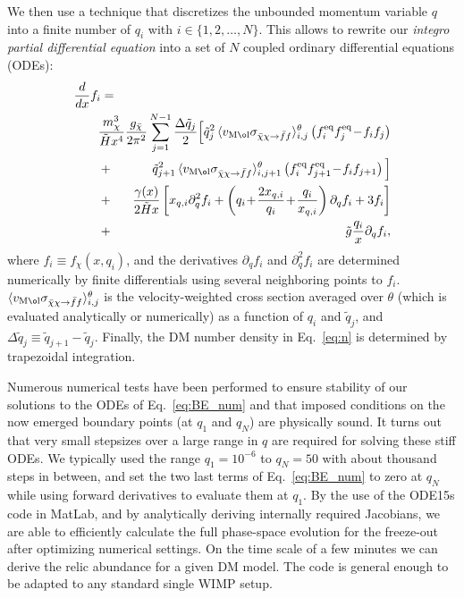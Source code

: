 \documentclass[twocolumn,showpacs,amsmath,amssymb,superscriptaddress,nofootinbib]{revtex4-1}
\def\nn{\nonumber}
\newcommand{\bea}{\begin{eqnarray}}
\newcommand{\eea}{\end{eqnarray}}
\newcommand{\p}{\partial}
\begin{document}
We then use a technique that  discretizes  the unbounded momentum variable $q$ into a finite number of 
$q_i$ with $i\in \{1,2,\ldots,N\}$. This allows to rewrite our  \emph{integro partial differential equation}  into 
a set of $N$ coupled ordinary differential equations (ODEs):
\bea
\frac{d}{dx} f_i &=& \nn\\
&& \hspace{-0.8cm} \frac{m_\chi^3}{\tilde{H} x^4}\frac{g_{\bar \chi} }{2\pi^2}
\sum_{j=1}^{N-1} 
\frac{\Delta \tilde q_j}{2} 
\Big[
   {\tilde q_j^2 } \,\langle v_{\rm M\o l} \sigma_{\bar\chi\chi\rightarrow \bar f f} \rangle_{i, j}^{\theta}
   \left( f^{\rm eq}_i f^{\rm eq}_j \!-\! f_if_j \right) \nn\\
&+&     {\tilde q_{j+1}^2 } \,\langle v_{\rm M\o l} \sigma_{\bar\chi\chi\rightarrow \bar f f} \rangle_{i, {j+1}}^{\theta}
 \left( f^{\rm eq}_i f^{\rm eq}_{j+1} \!-\! f_if_{j+1} \right)
\Big]
  \nn\\
&+&  \frac{\gamma(x)}{2 \tilde{H} x} \left[x_{q,i} \partial^2_q f_i+ \left(q_i\!+\!\frac{2 x_{q,i}}{q_i} \!+\! \frac{q_i}{x_{q,i}}  \right)\partial_q f_i+3 f_i\right] \nn\\
&+&    \tilde{g}   \frac{q_i}{x}  \partial_q f_i,
\label{eq:BE_num}
\eea
where $f_i \equiv f_\chi(x,q_i)$, and the derivatives $\p_q f_i$ and $\p^2_q f_i$ are determined numerically 
by finite differentials using several neighboring points to $f_i$.
$\langle v_{\rm M\o l} \sigma_{\bar\chi\chi\rightarrow \bar f f} \rangle_{i, j}^{\theta}$ is the
velocity-weighted cross section averaged over $\theta$ (which is evaluated analytically or numerically) 
as a function of $q_i$ and $\tilde{q}_j$, and $\Delta \tilde q_j \equiv  \tilde{q}_{j+1}- \tilde{q}_j$.  Finally, 
the DM number density in Eq.~\eqref{eq:n} is determined by trapezoidal integration.

Numerous numerical tests have been performed to ensure stability of our solutions to the ODEs of 
Eq.~\eqref{eq:BE_num} and that 
imposed conditions on the now emerged boundary points  (at $q_1$ and $q_N$) are physically sound.  
It turns out that very small stepsizes over a large range in $q$ are required for solving these stiff ODEs. 
We typically used the 
range $q_1 =10^{-6}$ to $q_N=50$ with about thousand steps in between, and set the two last terms of 
Eq.~\eqref{eq:BE_num} to zero at $q_N$ while using forward derivatives to evaluate them at $q_1$. 
By the use of  the ODE15s code in {\sf MatLab},
 and by analytically deriving internally required  Jacobians, we are 
able to efficiently calculate 
the full phase-space evolution for the freeze-out after optimizing numerical settings. On the time scale of a few minutes 
we can derive the relic abundance for a given DM model.
 The code is general enough to be adapted to any standard single WIMP setup.
\end{document}
